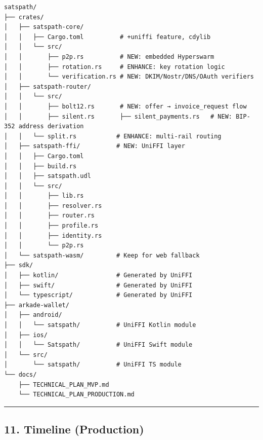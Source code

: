 \documentclass[
]{article}
\begin{document}
\begin{verbatim}
satspath/
├── crates/
│   ├── satspath-core/
│   │   ├── Cargo.toml          # +uniffi feature, cdylib
│   │   └── src/
│   │       ├── p2p.rs          # NEW: embedded Hyperswarm
│   │       ├── rotation.rs     # ENHANCE: key rotation logic
│   │       └── verification.rs # NEW: DKIM/Nostr/DNS/OAuth verifiers
│   ├── satspath-router/
│   │   └── src/
│   │       ├── bolt12.rs       # NEW: offer → invoice_request flow
│   │       ├── silent.rs       ├── silent_payments.rs   # NEW: BIP-352 address derivation
│   │   └── split.rs           # ENHANCE: multi-rail routing
│   ├── satspath-ffi/          # NEW: UniFFI layer
│   │   ├── Cargo.toml
│   │   ├── build.rs
│   │   ├── satspath.udl
│   │   └── src/
│   │       ├── lib.rs
│   │       ├── resolver.rs
│   │       ├── router.rs
│   │       ├── profile.rs
│   │       ├── identity.rs
│   │       └── p2p.rs
│   └── satspath-wasm/         # Keep for web fallback
├── sdk/
│   ├── kotlin/                # Generated by UniFFI
│   ├── swift/                 # Generated by UniFFI
│   └── typescript/            # Generated by UniFFI
├── arkade-wallet/
│   ├── android/
│   │   └── satspath/          # UniFFI Kotlin module
│   ├── ios/
│   │   └── Satspath/          # UniFFI Swift module
│   └── src/
│       └── satspath/          # UniFFI TS module
└── docs/
    ├── TECHNICAL_PLAN_MVP.md
    └── TECHNICAL_PLAN_PRODUCTION.md
\end{verbatim}

\begin{center}\rule{0.5\linewidth}{0.5pt}\end{center}

\hypertarget{timeline-production}{%
\subsection{11. Timeline (Production)}\label{timeline-production}}
\end{document}
